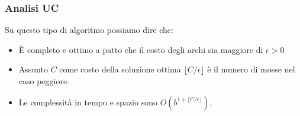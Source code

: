 \subsubsection{Analisi UC}
Su questo tipo di algoritmo possiamo dire che:
\begin{itemize}
	\item \`E completo e ottimo a patto che il costo degli archi sia maggiore di
	      $\epsilon > 0$
	\item Assunto $C$ come costo della soluzione ottima $\lfloor C/\epsilon \rfloor$ \`e
	      il numero di mosse nel caso peggiore.
	\item Le complessit\`a in tempo e spazio sono $O(b^{1+\lfloor C/\epsilon \rfloor})$.
\end{itemize}